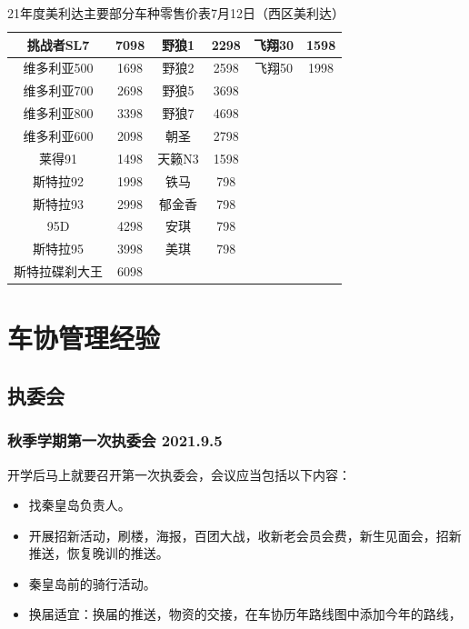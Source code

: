 \documentclass{ctexbook}
\begin{document}
\begin{table}[H]
\begin{tabular}{|c|c|c|c|c|c|}
    挑战者SL7                         & 7098       & 野狼1          & 2298       & 飞翔30         & 1598      \\ \hline
    维多利亚500                        & 1698       & 野狼2          & 2598       & 飞翔50         & 1998      \\ \hline
    维多利亚700                        & 2698       & 野狼5          & 3698       &              &           \\ \hline
    维多利亚800                        & 3398       & 野狼7          & 4698       &              &           \\ \hline
    维多利亚600                        & 2098       & 朝圣           & 2798       &              &           \\ \hline
    莱得91                           & 1498       & 天籁N3         & 1598       &              &           \\ \hline
    斯特拉92                          & 1998       & 铁马           & 798        &              &           \\ \hline
    斯特拉93                          & 2998       & 郁金香          & 798        &              &           \\ \hline
    95D                            & 4298       & 安琪           & 798        &              &           \\ \hline
    斯特拉95                          & 3998       & 美琪           & 798        &              &           \\ \hline
    斯特拉碟刹大王                        & 6098       &              &            &              &           \\ \hline
    \end{tabular}
    \caption{21年度美利达主要部分车种零售价表7月12日（西区美利达）}
\end{table} 
\chapter{车协管理经验}
\section{执委会}
\subsection{秋季学期第一次执委会 2021.9.5}
开学后马上就要召开第一次执委会，会议应当包括以下内容：
\begin{itemize}
    \item 找秦皇岛负责人。
    \item 开展招新活动，刷楼，海报，百团大战，收新老会员会费，新生见面会，招新推送，恢复晚训的推送。
    \item 秦皇岛前的骑行活动。
    \item 换届适宜：换届的推送，物资的交接，在车协历年路线图中添加今年的路线，
\end{itemize}
\end{document}
